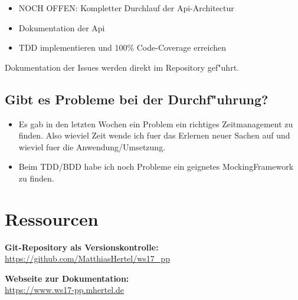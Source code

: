 \documentclass[12pt]{article}
\newcommand{\cmark}{\ding{51}}%
\newcommand{\done}{\rlap{$\square$}{\raisebox{2pt}{\large\hspace{1pt}\cmark}}%
\hspace{-2.5pt}}
\begin{document}
\begin{itemize}
\item NOCH OFFEN: Kompletter Durchlauf der Api-Architectur
\item Dokumentation der Api
\item TDD implementieren und 100\% Code-Coverage erreichen
\end{itemize}

Dokumentation der Issues werden direkt im Repository gef"uhrt.
\subsection{Gibt es Probleme bei der Durchf"uhrung?}
\begin{itemize}
\item Es gab in den letzten Wochen ein Problem ein richtiges Zeitmanagement zu finden. Also wieviel Zeit wende ich fuer das Erlernen neuer Sachen auf und wieviel fuer die Anwendung/Umsetzung.
\item Beim TDD/BDD habe ich noch Probleme ein geignetes MockingFramework zu finden.
\end{itemize}


\section{Ressourcen}
\textbf{Git-Repository als Versionskontrolle:}\\
\url{https://github.com/MatthiasHertel/ws17_pp}

\textbf{Webseite zur Dokumentation:}\\
\url{https://www.ws17-pp.mhertel.de}
\end{document}
